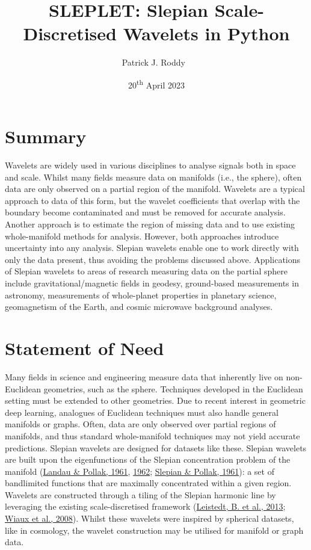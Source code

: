 \documentclass[
]{article}
\title{SLEPLET: Slepian Scale-Discretised Wavelets in Python}
\author[1%
  ]{Patrick J. Roddy%
    \,\orcidlink{0000-0002-6271-1700}\,%
    }
\affil[1]{Advanced Research Computing, University College London, UK}
\date{20\textsuperscript{th} April 2023}
\begin{document}
\maketitle

\hypertarget{summary}{%
\section{Summary}\label{summary}}

Wavelets are widely used in various disciplines to analyse signals both
in space and scale. Whilst many fields measure data on manifolds (i.e.,
the sphere), often data are only observed on a partial region of the
manifold. Wavelets are a typical approach to data of this form, but the
wavelet coefficients that overlap with the boundary become contaminated
and must be removed for accurate analysis. Another approach is to
estimate the region of missing data and to use existing whole-manifold
methods for analysis. However, both approaches introduce uncertainty
into any analysis. Slepian wavelets enable one to work directly with
only the data present, thus avoiding the problems discussed above.
Applications of Slepian wavelets to areas of research measuring data on
the partial sphere include gravitational/magnetic fields in geodesy,
ground-based measurements in astronomy, measurements of whole-planet
properties in planetary science, geomagnetism of the Earth, and cosmic
microwave background analyses.

\hypertarget{statement-of-need}{%
\section{Statement of Need}\label{statement-of-need}}

Many fields in science and engineering measure data that inherently live
on non-Euclidean geometries, such as the sphere. Techniques developed in
the Euclidean setting must be extended to other geometries. Due to
recent interest in geometric deep learning, analogues of Euclidean
techniques must also handle general manifolds or graphs. Often, data are
only observed over partial regions of manifolds, and thus standard
whole-manifold techniques may not yield accurate predictions. Slepian
wavelets are designed for datasets like these. Slepian wavelets are
built upon the eigenfunctions of the Slepian concentration problem of
the manifold (\protect\hyperlink{ref-Landau1961}{Landau \& Pollak,
1961}, \protect\hyperlink{ref-Landau1962}{1962};
\protect\hyperlink{ref-Slepian1961}{Slepian \& Pollak, 1961}): a set of
bandlimited functions that are maximally concentrated within a given
region. Wavelets are constructed through a tiling of the Slepian
harmonic line by leveraging the existing scale-discretised framework
(\protect\hyperlink{ref-Leistedt2013}{Leistedt, B. et al., 2013};
\protect\hyperlink{ref-Wiaux2008}{Wiaux et al., 2008}). Whilst these
wavelets were inspired by spherical datasets, like in cosmology, the
wavelet construction may be utilised for manifold or graph data.
\end{document}
